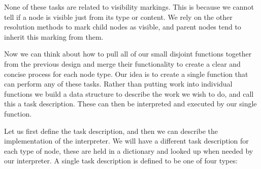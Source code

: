 \documentclass{report}
\begin{document}
None of these tasks are related to visibility markings. This is because we cannot tell if a node is visible just from its type or content. We rely on the
other resolution methods to mark child nodes as visible, and parent nodes tend to inherit this marking from them.

Now we can think about how to pull all of our small disjoint functions together from the previous design and merge their functionality to create a clear and
concise process for each node type. Our idea is to create a single function that can perform any of these tasks. Rather than putting work into individual
functions we build a data structure to describe the work we wish to do, and call this a task description. These can then be interpreted and executed by
our single function.

Let us first define the task description, and then we can describe the implementation of the interpreter. We will have a different task description for each
type of node, these are held in a dictionary and looked up when needed by our interpreter. A single task description is defined to be one of four types:
\end{document}
